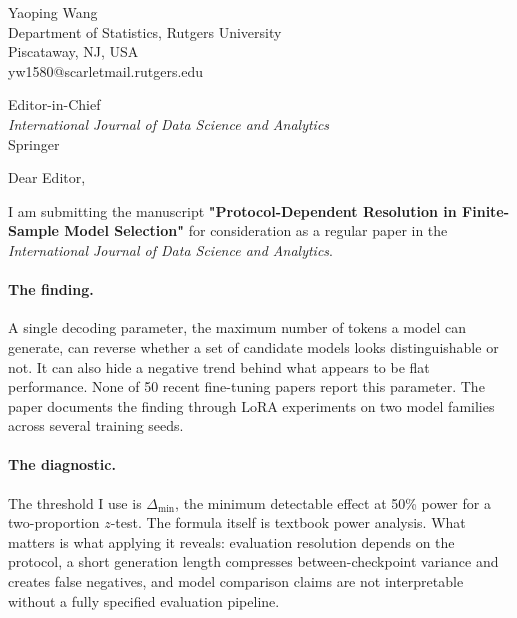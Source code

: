 \documentclass[12pt]{article}
\begin{document}
\begin{flushright}
Yaoping Wang\\
Department of Statistics, Rutgers University\\
Piscataway, NJ, USA\\
yw1580@scarletmail.rutgers.edu\\
\end{flushright}

\vspace{2em}

\begin{flushleft}
Editor-in-Chief\\
\textit{International Journal of Data Science and Analytics}\\
Springer
\end{flushleft}

\vspace{1em}

Dear Editor,

\vspace{1em}

I am submitting the manuscript \textbf{"Protocol-Dependent Resolution in Finite-Sample Model Selection"} for consideration as a regular paper in the \textit{International Journal of Data Science and Analytics}.

\paragraph{The finding.}
A single decoding parameter, the maximum number of tokens a model can generate, can reverse whether a set of candidate models looks distinguishable or not. It can also hide a negative trend behind what appears to be flat performance. None of 50 recent fine-tuning papers report this parameter. The paper documents the finding through LoRA experiments on two model families across several training seeds.

\paragraph{The diagnostic.}
The threshold I use is $\Delta_{\min}$, the minimum detectable effect at 50\% power for a two-proportion $z$-test. The formula itself is textbook power analysis. What matters is what applying it reveals: evaluation resolution depends on the protocol, a short generation length compresses between-checkpoint variance and creates false negatives, and model comparison claims are not interpretable without a fully specified evaluation pipeline.
\end{document}
